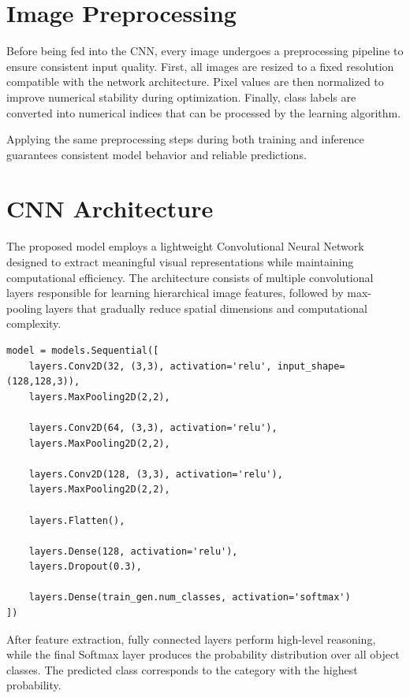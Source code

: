 \documentclass[a4paper,12pt]{report}
\begin{document}
\section{Image Preprocessing}
\label{sec:image-preprocessing}

Before being fed into the CNN, every image undergoes a preprocessing
pipeline to ensure consistent input quality. First, all images are resized
to a fixed resolution compatible with the network architecture. Pixel
values are then normalized to improve numerical stability during
optimization. Finally, class labels are converted into numerical indices
that can be processed by the learning algorithm.

Applying the same preprocessing steps during both training and inference
guarantees consistent model behavior and reliable predictions.

\section{CNN Architecture}
\label{sec:cnn-architecture}

The proposed model employs a lightweight Convolutional Neural Network
designed to extract meaningful visual representations while maintaining
computational efficiency. The architecture consists of multiple
convolutional layers responsible for learning hierarchical image features,
followed by max-pooling layers that gradually reduce spatial dimensions and
computational complexity.

\begin{lstlisting}[caption={Proposed CNN architecture}, label={lst:cnn-architecture}]
model = models.Sequential([
    layers.Conv2D(32, (3,3), activation='relu', input_shape=(128,128,3)),
    layers.MaxPooling2D(2,2),

    layers.Conv2D(64, (3,3), activation='relu'),
    layers.MaxPooling2D(2,2),

    layers.Conv2D(128, (3,3), activation='relu'),
    layers.MaxPooling2D(2,2),

    layers.Flatten(),

    layers.Dense(128, activation='relu'),
    layers.Dropout(0.3),

    layers.Dense(train_gen.num_classes, activation='softmax')
])
\end{lstlisting}

After feature extraction, fully connected layers perform high-level
reasoning, while the final Softmax layer produces the probability
distribution over all object classes. The predicted class corresponds to
the category with the highest probability.
\end{document}
